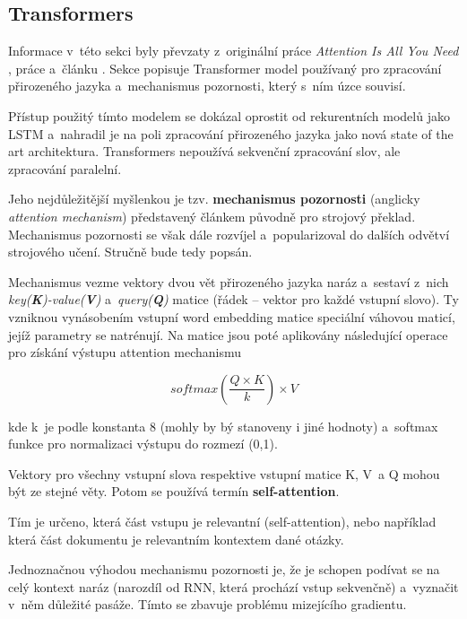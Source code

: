\subsection{Transformers}
\label{transformers}
Informace v~této sekci byly převzaty z~originální práce \emph{Attention Is All You Need} \cite{Transformers}, práce \cite{attention_mechanism} a~článku \cite{Transformers-explained}. Sekce popisuje Transformer model používaný pro zpracování přirozeného jazyka a~mechanismus pozornosti, který s~ním úzce souvisí.\par
Přístup použitý tímto modelem se dokázal oprostit od rekurentních modelů jako LSTM a~nahradil je na poli zpracování přirozeného jazyka jako nová state of the art architektura. Transformers nepoužívá sekvenční zpracování slov, ale zpracování paralelní.\par
Jeho nejdůležitější myšlenkou je tzv. \textbf{mechanismus pozornosti} (anglicky \emph{attention mechanism}) představený článkem \cite{attention_mechanism} původně pro strojový překlad. Mechanismus pozornosti se však dále rozvíjel a~popularizoval do dalších odvětví strojového učení. Stručně bude tedy popsán.\par \medskip

Mechanismus vezme vektory dvou vět přirozeného jazyka naráz a~sestaví z~nich \emph{key(\textbf{K})-value(\textbf{V})} a~\emph{query(\textbf{Q})} matice (řádek -- vektor pro každé vstupní slovo). Ty vzniknou vynásobením vstupní word embedding matice speciální váhovou maticí, jejíž parametry se natrénují. Na matice jsou poté aplikovány následující operace pro získání výstupu attention mechanismu

\begin{equation}
    \label{attention_dot_product}
    softmax(\frac{Q \times K}{k})\times V
\end{equation}

kde k~je podle \cite{Transformers} konstanta 8 (mohly by bý stanoveny i jiné hodnoty) a~softmax funkce pro normalizaci výstupu do rozmezí (0,1).\par
Vektory pro všechny vstupní slova respektive vstupní matice K, V~a Q mohou být ze stejné věty. Potom se používá termín \textbf{self-attention}.\par
Tím je určeno, která část vstupu je relevantní (self-attention), nebo například která část dokumentu je relevantním kontextem dané otázky.\par
Jednoznačnou výhodou mechanismu pozornosti je, že je schopen podívat se na celý kontext naráz (narozdíl od RNN, která prochází vstup sekvenčně) a~vyznačit v~něm důležité pasáže. Tímto se zbavuje problému mizejícího gradientu.\par\medskip

